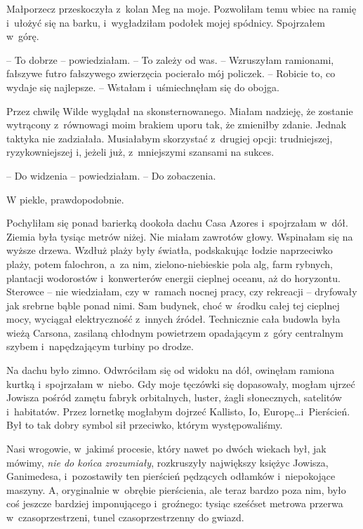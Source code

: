 \documentclass[oneside,polish,11pt,sfheadings]{mwbk}
\begin{document}
Małporzecz przeskoczyła z~kolan Meg na moje. Pozwoliłam temu wbiec na
ramię i~ułożyć się na barku, i~wygładziłam podołek mojej spódnicy.
Spojrzałem w~górę.

-- To dobrze -- powiedziałam. -- To zależy od was. -- Wzruszyłam ramionami,
fałszywe futro fałszywego zwierzęcia pocierało mój policzek. -- Robicie
to, co wydaje się najlepsze. -- Wstałam i~uśmiechnęłam się do obojga.

Przez chwilę Wilde wyglądał na skonsternowanego. Miałam nadzieję, że
zostanie wytrącony z~równowagi moim brakiem uporu tak, że zmieniłby
zdanie. Jednak taktyka nie zadziałała. Musiałabym skorzystać z~drugiej
opcji: trudniejszej, ryzykowniejszej i, jeżeli już, z~mniejszymi
szansami na sukces.

-- Do widzenia -- powiedziałam. -- Do zobaczenia.

W piekle, prawdopodobnie.

Pochyliłam się ponad barierką dookoła dachu Casa Azores i~spojrzałam w~dół. Ziemia była tysiąc metrów niżej. Nie miałam zawrotów głowy.
Wspinałam się na wyższe drzewa. Wzdłuż plaży były światła, podskakując
łodzie naprzeciwko plaży, potem falochron, a~za nim, zielono-niebieskie
pola alg, farm rybnych, plantacji wodorostów i~konwerterów energii
cieplnej oceanu, aż do horyzontu. Sterowce -- nie wiedziałam, czy w~ramach nocnej pracy, czy rekreacji -- dryfowały jak srebrne bąble ponad
nimi. Sam budynek, choć w~środku całej tej cieplnej mocy, wyciągał
elektryczność z~innych źródeł. Technicznie cała budowla była wieżą
Carsona, zasilaną chłodnym powietrzem opadającym z~góry centralnym
szybem i~napędzającym turbiny po drodze.

Na dachu było zimno. Odwróciłam się od widoku na dół, owinęłam ramiona
kurtką i~spojrzałam w~niebo. Gdy moje tęczówki się dopasowały, mogłam
ujrzeć Jowisza pośród zamętu fabryk orbitalnych, luster, żagli
słonecznych, satelitów i~habitatów. Przez lornetkę mogłabym dojrzeć
Kallisto, Io, Europę\ldots  i~Pierścień. Był to tak dobry symbol sił
przeciwko, którym występowaliśmy.

Nasi wrogowie, w~jakimś procesie, który nawet po dwóch wiekach był, jak
mówimy, \textit{nie do końca zrozumiały}, rozkruszyły największy księżyc
Jowisza, Ganimedesa, i~pozostawiły ten pierścień pędzących odłamków i~niepokojące maszyny. A, oryginalnie w~obrębie pierścienia, ale teraz
bardzo poza nim, było coś jeszcze bardziej imponującego i~groźnego:
tysiąc sześćset metrowa przerwa w~czasoprzestrzeni, tunel
czasoprzestrzenny do gwiazd.
\end{document}
